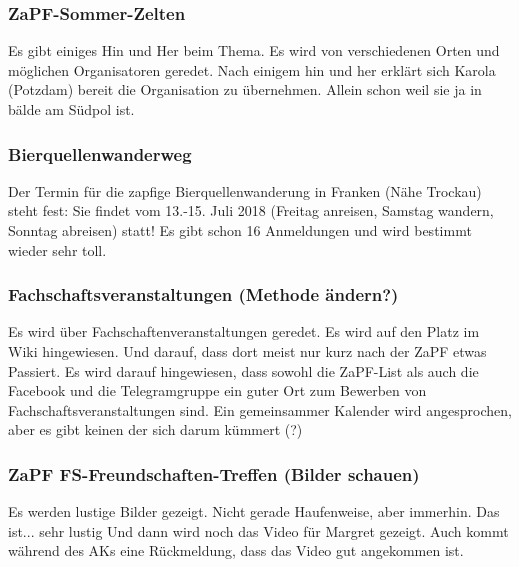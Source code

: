   \subsubsection{ZaPF-Sommer-Zelten}
    Es gibt einiges Hin und Her beim Thema. Es wird von verschiedenen Orten und möglichen Organisatoren geredet. Nach einigem hin und her erklärt sich Karola (Potzdam) bereit die Organisation zu übernehmen. Allein schon weil sie ja in bälde am Südpol ist.

  \subsubsection{Bierquellenwanderweg}
    Der Termin für die zapfige Bierquellenwanderung in Franken (Nähe Trockau) steht fest: Sie findet vom 13.-15. Juli 2018 (Freitag anreisen, Samstag wandern, Sonntag abreisen) statt!
    Es gibt schon 16 Anmeldungen und wird bestimmt wieder sehr toll.

  \subsubsection{Fachschaftsveranstaltungen (Methode ändern?)}
    Es wird über Fachschaftenveranstaltungen geredet. Es wird auf den Platz im Wiki hingewiesen. Und darauf, dass dort meist nur kurz nach der ZaPF etwas Passiert.
    Es wird darauf hingewiesen, dass sowohl die ZaPF-List als auch die Facebook und die Telegramgruppe ein guter Ort zum Bewerben von Fachschaftsveranstaltungen sind.
    Ein gemeinsammer Kalender wird angesprochen, aber es gibt keinen der sich darum kümmert (?)

  \subsubsection{ZaPF FS-Freundschaften-Treffen (Bilder schauen)}
    Es werden lustige Bilder gezeigt. Nicht gerade Haufenweise, aber immerhin. Das ist... sehr lustig
    Und dann wird noch das Video für Margret gezeigt. Auch kommt während des AKs eine Rückmeldung, dass das Video gut angekommen ist.
